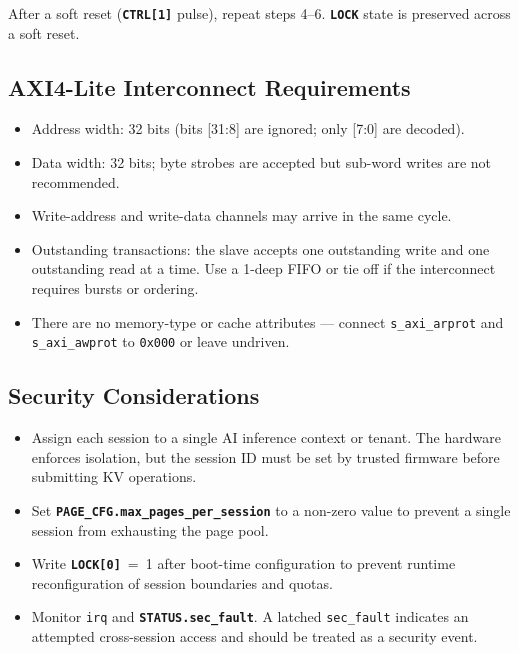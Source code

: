 \documentclass[10pt, a4paper]{article}
\newcommand{\reg}[1]{\texttt{\textbf{#1}}}
\newcommand{\field}[1]{\texttt{#1}}
\newcommand{\hex}[1]{\texttt{0x#1}}
\newcommand{\portname}[1]{\texttt{#1}}
\begin{document}
After a soft reset (\reg{CTRL[1]} pulse), repeat steps 4–6.
\reg{LOCK} state is preserved across a soft reset.

\subsection{AXI4-Lite Interconnect Requirements}

\begin{itemize}
  \item Address width: 32 bits (bits [31:8] are ignored; only [7:0] are decoded).
  \item Data width: 32 bits; byte strobes are accepted but sub-word writes are
        not recommended.
  \item Write-address and write-data channels may arrive in the same cycle.
  \item Outstanding transactions: the slave accepts one outstanding write and
        one outstanding read at a time. Use a 1-deep FIFO or tie off if the
        interconnect requires bursts or ordering.
  \item There are no memory-type or cache attributes — connect
        \portname{s\_axi\_arprot} and \portname{s\_axi\_awprot} to \hex{000}
        or leave undriven.
\end{itemize}

\subsection{Security Considerations}

\begin{itemize}
  \item Assign each session to a single AI inference context or tenant.
        The hardware enforces isolation, but the session ID must be set by
        trusted firmware before submitting KV operations.
  \item Set \reg{PAGE\_CFG.max\_pages\_per\_session} to a non-zero value
        to prevent a single session from exhausting the page pool.
  \item Write \reg{LOCK[0]}~=~1 after boot-time configuration to prevent
        runtime reconfiguration of session boundaries and quotas.
  \item Monitor \portname{irq} and \reg{STATUS.sec\_fault}. A latched
        \field{sec\_fault} indicates an attempted cross-session access
        and should be treated as a security event.
\end{itemize}
\end{document}

